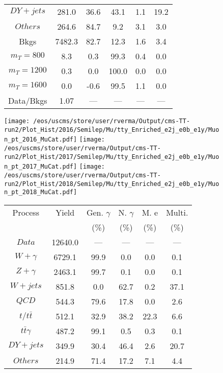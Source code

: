 \begin{figure}
\begin{minipage}[c]{0.32\textwidth}
{\begin{tabular}{cccccc}
$ DY+jets $ &  281.0 &  36.6 &  43.1 &  1.1 &  19.2\\
$ Others $ &  264.6 &  84.7 &  9.2 &  3.1 &  3.0\\
Bkgs &  7482.3 &  82.7 &  12.3 &  1.6 &  3.4\\
$ m_{T} = 800 $ &  8.3 &  0.3 &  99.3 &  0.4 &  0.0\\
$ m_{T} = 1200 $ &  0.3 &  0.0 &  100.0 &  0.0 &  0.0\\
$ m_{T} = 1600 $ &  0.0 &  -0.6 &  99.5 &  1.1 &  0.0\\
Data/Bkgs &  1.07 &  --- &  --- &  --- &  ---\\
\hline
\end{tabular}
}
\end{minipage}
\end{figure}

\begin{figure}
\centering
\texttt{[image: /eos/uscms/store/user/rverma/Output/cms-TT-run2/Plot\_Hist/2016/Semilep/Mu/tty\_Enriched\_e2j\_e0b\_e1y/Muon\_pt\_2016\_MuCat.pdf]}
\texttt{[image: /eos/uscms/store/user/rverma/Output/cms-TT-run2/Plot\_Hist/2017/Semilep/Mu/tty\_Enriched\_e2j\_e0b\_e1y/Muon\_pt\_2017\_MuCat.pdf]}
\texttt{[image: /eos/uscms/store/user/rverma/Output/cms-TT-run2/Plot\_Hist/2018/Semilep/Mu/tty\_Enriched\_e2j\_e0b\_e1y/Muon\_pt\_2018\_MuCat.pdf]}
\begin{minipage}[c]{0.32\textwidth}
\centering
\tiny{
\begin{tabular}{cccccc}
\hline
Process & Yield & Gen. $\gamma$ & N. $\gamma$ & M. e & Multi. \\
 &  & (\%) & (\%) & (\%) & (\%)  \\
\hline
                                                                      $ Data $ &  12640.0 &  --- &  --- &  --- &  ---\\
$ W+\gamma $ &  6729.1 &  99.9 &  0.0 &  0.0 &  0.1\\
$ Z+\gamma $ &  2463.1 &  99.7 &  0.1 &  0.0 &  0.1\\
$ W+jets $ &  851.8 &  0.0 &  62.7 &  0.2 &  37.1\\
$ QCD $ &  544.3 &  79.6 &  17.8 &  0.0 &  2.6\\
$ t/t\bar{t} $ &  512.1 &  32.9 &  38.2 &  22.3 &  6.6\\
$ t\bar{t}\gamma $ &  487.2 &  99.1 &  0.5 &  0.3 &  0.1\\
$ DY+jets $ &  349.9 &  30.4 &  46.4 &  2.6 &  20.7\\
$ Others $ &  214.9 &  71.4 &  17.2 &  7.1 &  4.4\\

\end{tabular}}
\end{minipage}
\end{figure}
